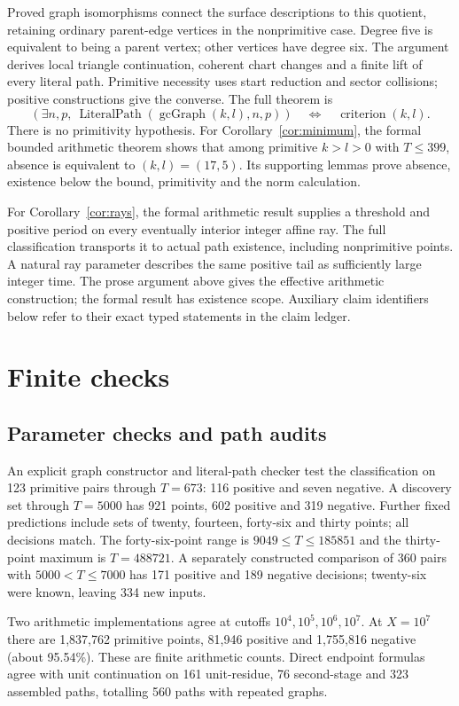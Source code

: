 \documentclass[11pt]{amsart}
\begin{document}
Proved graph isomorphisms connect the surface descriptions to this
quotient, retaining ordinary parent-edge vertices in the nonprimitive
case. Degree five is equivalent to being a parent vertex; other vertices
have degree six. The argument derives local triangle continuation,
coherent chart changes and a finite lift of every literal path.
Primitive necessity uses start reduction and sector collisions;
positive constructions give the converse. The full theorem is
\[
 (\exists n,p,\ \operatorname{LiteralPath}(\operatorname{gcGraph}(k,l),n,p))
 \quad\Longleftrightarrow\quad \operatorname{criterion}(k,l).
\]
There is no primitivity hypothesis. For Corollary~\ref{cor:minimum},
the formal bounded arithmetic theorem shows that among primitive
$k>l>0$ with $T\le399$, absence is equivalent to $(k,l)=(17,5)$.
Its supporting lemmas prove absence, existence below the bound,
primitivity and the norm calculation.

For Corollary~\ref{cor:rays}, the formal arithmetic result supplies a
threshold and positive period on every eventually interior integer
affine ray. The full classification transports it to actual path
existence, including nonprimitive points. A natural ray parameter
describes the same positive tail as sufficiently large integer time.
The prose argument above gives the effective arithmetic construction;
the formal result has existence scope. Auxiliary claim identifiers
below refer to their exact typed statements in the claim ledger.

\section{Finite checks}\label{sec:checks}
\subsection{Parameter checks and path audits}
An explicit graph constructor and literal-path checker test the
classification on 123 primitive pairs through $T=673$: 116 positive
and seven negative. A discovery set through $T=5000$ has 921 points,
602 positive and 319 negative. Further fixed predictions include
sets of twenty, fourteen, forty-six and thirty points; all decisions
match. The forty-six-point range is $9049\le T\le185851$ and the
thirty-point maximum is $T=488721$. A separately constructed comparison
of 360 pairs with $5000<T\le7000$ has 171 positive and 189 negative
decisions; twenty-six were known, leaving 334 new inputs.

Two arithmetic implementations agree at cutoffs $10^4,10^5,10^6,10^7$.
At $X=10^7$ there are 1,837,762 primitive points, 81,946 positive and
1,755,816 negative (about 95.54\%). These are finite arithmetic counts.
Direct endpoint formulas agree with unit continuation on 161 unit-residue,
76 second-stage and 323 assembled paths, totalling 560 paths with
repeated graphs.
\end{document}
